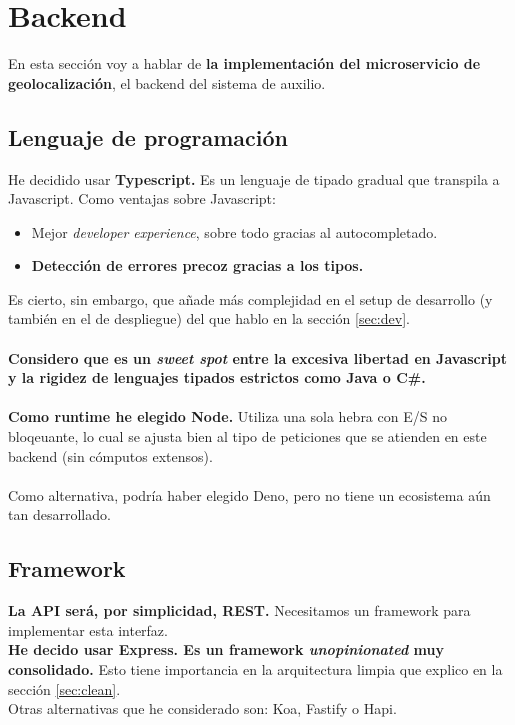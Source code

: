 \chapter{Backend}

En esta sección voy a hablar de \textbf{la implementación del microservicio de geolocalización}, el backend del sistema de auxilio.
\section{Lenguaje de programación}
He decidido usar \textbf{Typescript.} Es un lenguaje de tipado gradual que transpila a Javascript.
Como ventajas sobre Javascript:
\begin{itemize}
	\item Mejor \textit{developer experience}, sobre todo gracias al autocompletado.
	\item \textbf{Detección de errores precoz gracias a los tipos.}
\end{itemize}
Es cierto, sin embargo, que añade más complejidad en el setup de desarrollo (y también en el de despliegue) del que hablo en la sección \ref{sec:dev}. \\ \\
\textbf{Considero que es un \textit{sweet spot} entre la excesiva libertad en Javascript y la rigidez de lenguajes tipados estrictos como Java o C\#.} \\ \\

\textbf{Como runtime he elegido Node.} Utiliza una sola hebra con E/S no bloqeuante, lo cual se ajusta bien al tipo 
de peticiones que se atienden en este backend (sin cómputos extensos).  \\ \\
Como alternativa, podría haber elegido Deno, pero no tiene un ecosistema aún tan desarrollado.

\section{Framework}
\textbf{La API será, por simplicidad, REST.} Necesitamos un framework para implementar esta interfaz. \\

\textbf{He decido usar Express. Es un framework \textit{unopinionated} muy consolidado.} Esto tiene importancia en la 
arquitectura limpia que explico en la sección \ref{sec:clean}. \\
Otras alternativas que he considerado son: Koa, Fastify o Hapi.

